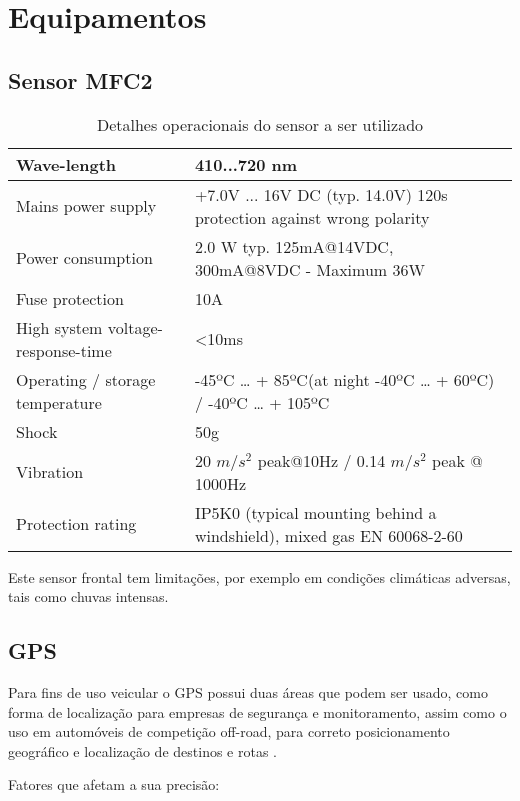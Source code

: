 \chapter[Equipamentos]{Equipamentos}

\section {Sensor MFC2} \cite{mfc}

\begin{table}[ht]
\caption{Detalhes operacionais do sensor a ser utilizado}
\centering
\begin{tabular}{| l |  p{7cm} |}
\hline
Wave-length & 410...720 nm  \\
\hline
Mains power supply & +7.0V ... 16V DC (typ. 14.0V) 120s protection against wrong polarity \\
\hline
Power consumption & 2.0 W typ. 125mA@14VDC, 300mA@8VDC - Maximum 36W \\
\hline
Fuse protection & 10A \\
\hline
High system voltage-response-time & <10ms \\
\hline
Operating / storage temperature & -45ºC … + 85ºC(at night -40ºC … + 60ºC) / -40ºC … + 105ºC \\
\hline
Shock & 50g \\
\hline
Vibration & 20 $m/s^2$ peak@10Hz / 0.14 $m/s^2$ peak @ 1000Hz \\
\hline
Protection rating & IP5K0 (typical mounting behind a windshield), mixed gas EN 60068-2-60 \\
\hline
\end{tabular}
\end{table}

Este sensor frontal tem limitações, por exemplo em condições climáticas adversas, tais como chuvas intensas.

\section{GPS}

Para fins de uso veicular o GPS possui duas áreas que podem ser usado, como forma de localização para empresas de segurança e monitoramento, assim como o uso em automóveis de competição off-road, para correto posicionamento geográfico e localização de destinos e rotas \cite{gps3}.

Fatores que afetam a sua precisão:

